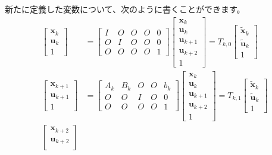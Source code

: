 \documentclass[a4paper]{jarticle}
\begin{document}
新たに定義した変数について、次のように書くことができます。
\begin{align*}
  \begin{bmatrix}
  \mathbf{x}_{k}\\
  \mathbf{u}_{k}\\
  1
  \end{bmatrix}
  &=
  \begin{bmatrix}
  I & O & O & O & 0\\
  O & I & O & O & 0 \\
  O & O & O & O & 1 
  \end{bmatrix}    
  \begin{bmatrix}
  \mathbf{x}_{k}\\
  \mathbf{u}_{k}\\
  \mathbf{u}_{k+1}\\
  \mathbf{u}_{k+2}\\
  1
  \end{bmatrix}
  =
  T_{k,0}
  \begin{bmatrix}
  \tilde{\mathbf{x}}_{k}\\
  \tilde{\mathbf{u}}_{k}\\
  1
  \end{bmatrix}
  \\
  \begin{bmatrix}
  \mathbf{x}_{k+1}\\
  \mathbf{u}_{k+1}\\
  1
  \end{bmatrix}
  &=
  \begin{bmatrix}
  A_k & B_k & O & O & b_k\\
  O & O & I & O & 0 \\
  O & O & O & O & 1 
  \end{bmatrix}    
  \begin{bmatrix}
  \mathbf{x}_{k}\\
  \mathbf{u}_{k}\\
  \mathbf{u}_{k+1}\\
  \mathbf{u}_{k+2}\\
  1
  \end{bmatrix}
  =
  T_{k,1}
  \begin{bmatrix}
  \tilde{\mathbf{x}}_{k}\\
  \tilde{\mathbf{u}}_{k}\\
  1
  \end{bmatrix}
  \\
  \begin{bmatrix}
  \mathbf{x}_{k+2}\\
  \mathbf{u}_{k+2}\\

\end{bmatrix}
\end{align*}
\end{document}
